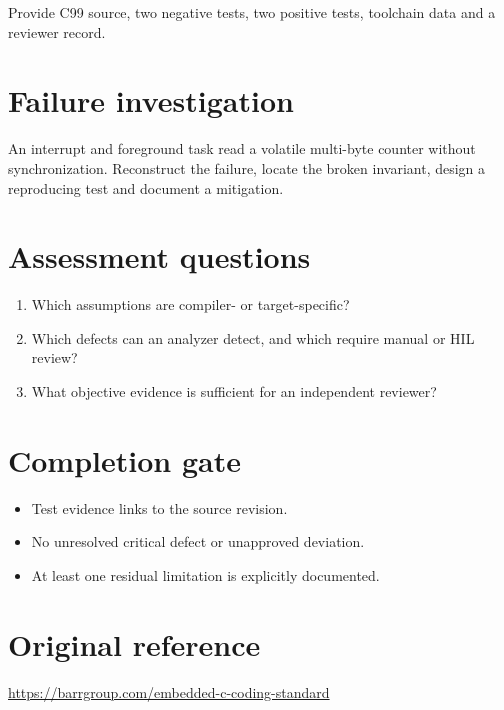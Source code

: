 \documentclass[10pt,letterpaper]{article}
\begin{document}
Provide C99 source, two negative tests, two positive tests, toolchain data and a reviewer record.
\section{Failure investigation}
An interrupt and foreground task read a volatile multi-byte counter without synchronization. Reconstruct the failure, locate the broken invariant, design a reproducing test and document a mitigation.
\section{Assessment questions}
\begin{enumerate}
\item Which assumptions are compiler- or target-specific?
\item Which defects can an analyzer detect, and which require manual or HIL review?
\item What objective evidence is sufficient for an independent reviewer?
\end{enumerate}

\section{Completion gate}
\begin{itemize}
\item Test evidence links to the source revision.
\item No unresolved critical defect or unapproved deviation.
\item At least one residual limitation is explicitly documented.
\end{itemize}

\section{Original reference}
\url{https://barrgroup.com/embedded-c-coding-standard}
\end{document}
